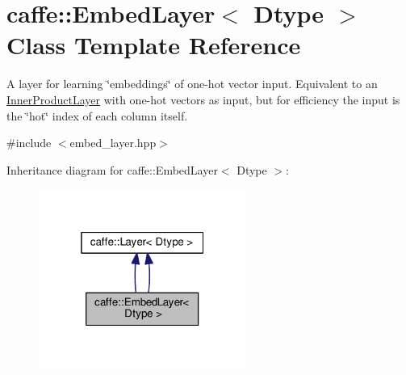 \hypertarget{classcaffe_1_1_embed_layer}{}\section{caffe\+:\+:Embed\+Layer$<$ Dtype $>$ Class Template Reference}
\label{classcaffe_1_1_embed_layer}


A layer for learning \char`\"{}embeddings\char`\"{} of one-\/hot vector input. Equivalent to an \mbox{\hyperlink{classcaffe_1_1_inner_product_layer}{Inner\+Product\+Layer}} with one-\/hot vectors as input, but for efficiency the input is the \char`\"{}hot\char`\"{} index of each column itself.  




{\ttfamily \#include $<$embed\+\_\+layer.\+hpp$>$}



Inheritance diagram for caffe\+:\+:Embed\+Layer$<$ Dtype $>$\+:
\nopagebreak
\begin{figure}[H]
\begin{center}
\leavevmode
\includegraphics[width=193pt]{classcaffe_1_1_embed_layer__inherit__graph}
\end{center}
\end{figure}
